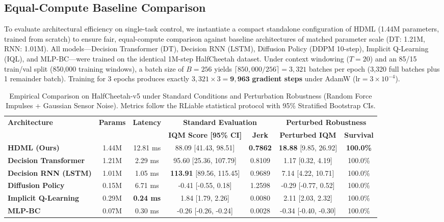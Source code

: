 \documentclass{article}
\begin{document}
\subsection{Equal-Compute Baseline Comparison}
To evaluate architectural efficiency on single-task control, we instantiate a compact standalone configuration of HDML (1.44M parameters, trained from scratch) to ensure fair, equal-compute comparison against baseline architectures of matched parameter scale (DT: 1.21M, RNN: 1.01M). All models---Decision Transformer (DT), Decision RNN (LSTM), Diffusion Policy (DDPM 10-step), Implicit Q-Learning (IQL), and MLP-BC---were trained on the identical 1M-step HalfCheetah dataset. Under context windowing ($T=20$) and an 85/15 train/val split (850,000 training windows), a batch size of $B=256$ yields $\lceil 850{,}000 / 256 \rceil = 3{,}321$ batches per epoch (3,320 full batches plus 1 remainder batch). Training for 3 epochs produces exactly $3{,}321 \times 3 = \mathbf{9{,}963}$ \textbf{gradient steps} under AdamW ($\text{lr}=3\times 10^{-4}$).

\begin{table}[h]
\centering
\caption{Empirical Comparison on HalfCheetah-v5 under Standard Conditions and Perturbation Robustness (Random Force Impulses + Gaussian Sensor Noise). Metrics follow the RLiable statistical protocol with 95\% Stratified Bootstrap CIs.}
\label{tab:baseline_comparison}
\small
\begin{tabular}{lcccccc}
\toprule
\multirow{2}{*}{\textbf{Architecture}} & \multirow{2}{*}{\textbf{Params}} & \multirow{2}{*}{\textbf{Latency}} & \multicolumn{2}{c}{\textbf{Standard Evaluation}} & \multicolumn{2}{c}{\textbf{Perturbed Robustness}} \\
\cmidrule(lr){4-5} \cmidrule(lr){6-7}
& & & \textbf{IQM Score [95\% CI]} & \textbf{Jerk} & \textbf{Perturbed IQM} & \textbf{Survival} \\
\midrule
\textbf{HDML (Ours)}            & 1.44M & 12.81 ms & 88.09 [41.43, 98.51]   & \textbf{0.7862} & \textbf{18.88} [9.85, 26.92] & \textbf{100.0\%} \\
\textbf{Decision Transformer}   & 1.21M & 2.29 ms  & 95.60 [25.36, 107.79]  & 0.8109          & 1.17 [0.32, 4.19]            & 100.0\% \\
\textbf{Decision RNN (LSTM)}    & 1.01M & 1.05 ms  & \textbf{113.91} [89.56, 115.45] & 0.9689 & 7.14 [4.22, 10.71]           & 100.0\% \\
\textbf{Diffusion Policy}       & 0.15M & 6.71 ms  & -0.41 [-0.55, 0.18]    & 1.2598          & -0.29 [-0.77, 0.52]          & 100.0\% \\
\textbf{Implicit Q-Learning}    & 0.29M & \textbf{0.24 ms} & 1.84 [1.79, 2.26]      & 0.0080          & 2.11 [2.03, 2.32]            & 100.0\% \\
\textbf{MLP-BC}                 & 0.07M & 0.30 ms  & -0.26 [-0.26, -0.24]   & 0.0028          & -0.34 [-0.40, -0.30]         & 100.0\% \\
\bottomrule
\end{tabular}
\end{table}
\end{document}
